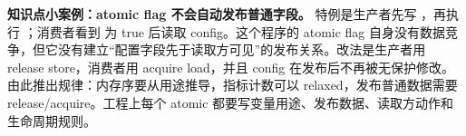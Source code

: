 \begin{casebox}
\textbf{知识点小案例：atomic flag 不会自动发布普通字段。}
特例是生产者先写 ，再执行 ；消费者看到  为 true 后读取 config。这个程序的 atomic flag 自身没有数据竞争，但它没有建立“配置字段先于读取方可见”的发布关系。改法是生产者用 release store，消费者用 acquire load，并且 config 在发布后不再被无保护修改。由此推出规律：内存序要从用途推导，指标计数可以 relaxed，发布普通数据需要 release/acquire。工程上每个 atomic 都要写变量用途、发布数据、读取方动作和生命周期规则。
\end{casebox}
